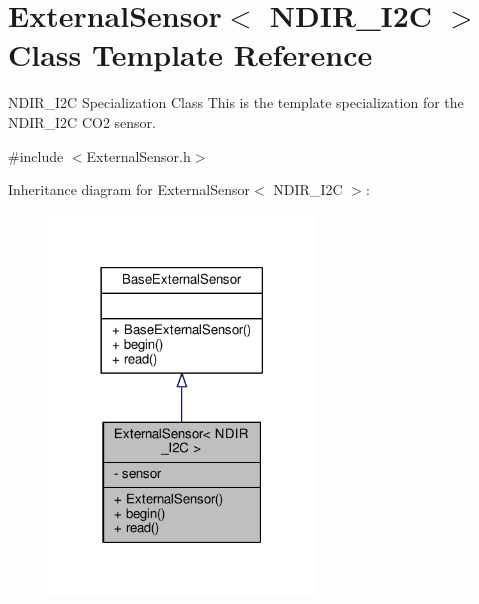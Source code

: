 \hypertarget{classExternalSensor_3_01NDIR__I2C_01_4}{}\section{External\+Sensor$<$ N\+D\+I\+R\+\_\+\+I2C $>$ Class Template Reference}
\label{classExternalSensor_3_01NDIR__I2C_01_4}


N\+D\+I\+R\+\_\+\+I2C Specialization Class This is the template specialization for the N\+D\+I\+R\+\_\+\+I2C C\+O2 sensor.  




{\ttfamily \#include $<$External\+Sensor.\+h$>$}



Inheritance diagram for External\+Sensor$<$ N\+D\+I\+R\+\_\+\+I2C $>$\+:\nopagebreak
\begin{figure}[H]
\begin{center}
\leavevmode
\includegraphics[width=201pt]{classExternalSensor_3_01NDIR__I2C_01_4__inherit__graph}
\end{center}
\end{figure}


